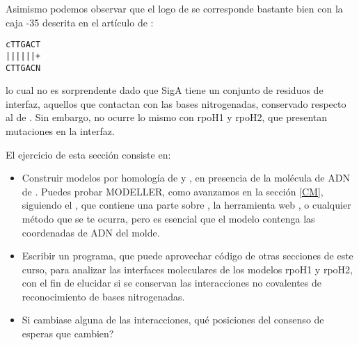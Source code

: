 Asimismo podemos observar que el logo de 
se corresponde bastante bien con la caja -35 descrita en el art\'{i}culo de \cite{RamirezRomero2006}:
\begin{center} 
\texttt{cTTGACT}\\
\texttt{||||||+}\\
\texttt{CTTGACN}\\
\end{center} 
lo cual no es sorprendente dado que SigA tiene un conjunto de residuos de interfaz, aquellos que contactan con las bases nitrogenadas,
conservado respecto al de . Sin embargo, no 
ocurre lo mismo con rpoH1 y rpoH2, que presentan mutaciones en la interfaz.

El ejercicio de esta secci\'{o}n consiste en:
\begin{itemize}

\item Construir modelos por homolog\'{i}a de 
 y
, en presencia de la mol\'{e}cula de ADN de 
. Puedes probar MODELLER, 
como avanzamos en la secci\'{o}n \ref{CM}, siguiendo el 
, que contiene una parte sobre 
, la herramienta web 
, o cualquier m\'{e}todo que se te ocurra, 
pero es esencial que el modelo contenga las coordenadas de ADN del molde.

\item Escribir un programa, que puede aprovechar c\'{o}digo de otras secciones de este curso, para analizar las interfaces
moleculares de los modelos rpoH1 y rpoH2, con el fin de elucidar si se conservan las interacciones no covalentes
de reconocimiento de bases nitrogenadas.

\item Si cambiase alguna de las interacciones, qu\'{e} posiciones del consenso de 
esperas que cambien?

\end{itemize}




